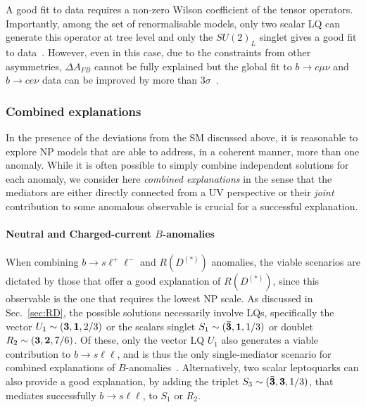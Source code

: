 \documentclass[10pt]{article}
\begin{document}
A good fit to data requires a non-zero Wilson coefficient of the tensor operators. Importantly, among the set of renormalisable models, only two scalar LQ can generate this operator at tree level and only the $SU(2)_L$ singlet gives a good fit to data~\cite{Carvunis:2021dss}. However, even in this case, due to the constraints from other asymmetries, $\Delta A_{FB}$ cannot be fully explained but the global fit to $b\to c\mu\nu$ and $b\to c e\nu$ data can be improved by more than $3\sigma$~\cite{Carvunis:2021dss}.


\subsubsection{Combined explanations}
\label{sec:combined_expl} %
%
In the presence of the deviations from the SM discussed above, it is reasonable to explore NP models that are able to address, in a coherent manner, more than one anomaly. While it is often possible to simply combine independent solutions for each anomaly, we consider here \emph{combined explanations} in the sense that the mediators are either directly connected from a UV perspective or their \emph{joint} contribution to some anomalous observable is crucial for a successful explanation.

\paragraph{\boldmath Neutral and Charged-current $B$-anomalies}
%
When combining $b\to s\ell^+\ell^-$ and $R(D^{(*)})$ anomalies, the viable scenarios are dictated by those that offer a good explanation of $R(D^{(*)})$, since this observable is the one that requires the lowest NP scale. As discussed in Sec.~\ref{sec:RD}, the possible solutions necessarily involve LQs, specifically the vector $U_1 \sim ({\bf 3}, {\bf 1}, 2/3)$ or the scalars singlet $S_1 \sim ({\bf \bar 3}, {\bf 1}, 1/3)$ or doublet $R_2 \sim ({\bf 3}, {\bf 2}, 7/6)$. Of these, only the vector LQ  $U_1$ also generates a viable contribution to $b\to s \ell \ell$, and is thus the only single-mediator scenario for combined explanations of $B$-anomalies~\cite{Barbieri:2015yvd,Buttazzo:2017ixm,DiLuzio:2017vat,Bordone:2017bld,Calibbi:2017qbu,Blanke:2018sro,Crivellin:2018yvo,Angelescu:2018tyl,Cornella:2019hct,Fuentes-Martin:2019ign,Fuentes-Martin:2020luw,Fuentes-Martin:2020hvc,Cornella:2021sby,Angelescu:2021lln}. Alternatively, two scalar leptoquarks can also provide a good explanation, by adding the triplet $S_3 \sim ({\bf \bar 3}, {\bf 3}, 1/3) $, that mediates successfully $b\to s \ell \ell$, to $S_1$ or $R_2$.
\end{document}
